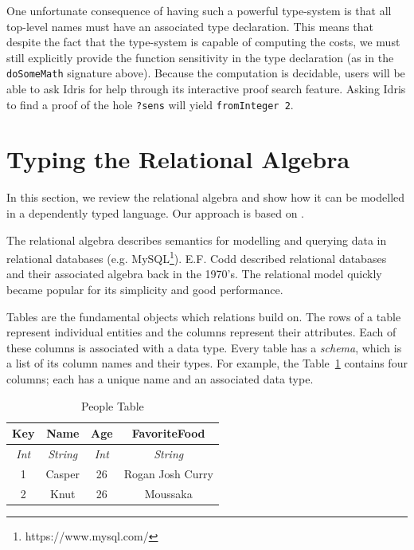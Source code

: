 \documentclass[12pt]{article}
\begin{document}
One unfortunate consequence of having such a powerful type-system is that all top-level names must have an associated type declaration.
This means that despite the fact that the type-system is capable of computing the costs, we must still explicitly provide the function sensitivity in the type declaration (as in the \texttt{doSomeMath} signature above).
Because the computation is decidable, users will be able to ask Idris for help through its interactive proof search feature.
Asking Idris to find a proof of the hole \texttt{?sens} will yield \texttt{fromInteger 2}.

\section{Typing the Relational Algebra}\label{sec:typing_the_relational_algebra}

In this section, we review the relational algebra and show how it can be modelled in a dependently typed language.
Our approach is based on \cite{OurySwierstra08PowerOfPi}.

The relational algebra describes semantics for modelling and querying data in relational databases (e.g. MySQL\footnote{https://www.mysql.com/}).
E.F. Codd described relational databases and their associated algebra back in the 1970's\cite{codd70}.
The relational model quickly became popular for its simplicity and good performance.

Tables are the fundamental objects which relations build on.
The rows of a table represent individual entities and the columns represent their attributes.
Each of these columns is associated with a data type.
Every table has a \textit{schema}, which is a list of its column names and their types.
For example, the Table~\ref{tab:people_table} contains four columns; each has a unique name and an associated data type.

\begin{table}[tb]
    \caption{People Table}
    \label{tab:people_table}
    \centering

    \begin{tabular}{|c|c|c|c|}
    \hline

    \hline
    \textbf{Key} & \textbf{Name} & \textbf{Age} & \textbf{FavoriteFood} \\
    \hline
    \textit{Int} & \textit{String} & \textit{Int} & \textit{String} \\
    \hline
    \hline
       1 & Casper & 26 & Rogan Josh Curry \\
       2 & Knut & 26 & Moussaka \\
    \hline

    \end{tabular}
\end{table}
\end{document}
